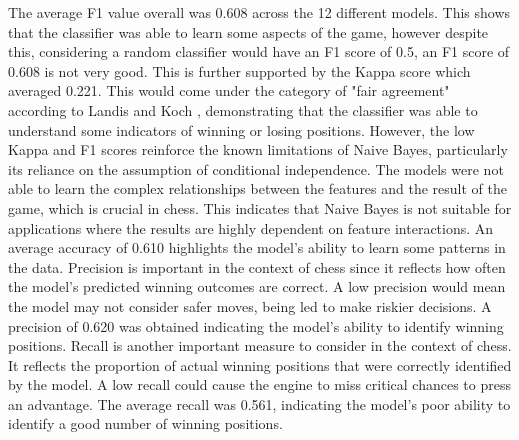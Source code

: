 The average F1 value overall was 0.608 across the 12 different models. This shows that the classifier was able to learn some aspects of the game, however despite this, considering a random classifier would have an F1 score of 0.5, an F1 score of 0.608 is not very good. This is further supported by the Kappa score which averaged 0.221. This would come under the category of "fair agreement" according to Landis and Koch \cite{landisMeasurementObserverAgreement1977}, demonstrating that the classifier was able to understand some indicators of winning or losing positions. However, the low Kappa and F1 scores reinforce the known limitations of Naive Bayes, particularly its reliance on the assumption of conditional independence. The models were not able to learn the complex relationships between the features and the result of the game, which is crucial in chess. This indicates that Naive Bayes is not suitable for applications where the results are highly dependent on feature interactions. An average accuracy of 0.610 highlights the model's ability to learn some patterns in the data. Precision is important in the context of chess since it reflects how often the model's predicted winning outcomes are correct. A low precision would mean the model may not consider safer moves, being led to make riskier decisions. A precision of 0.620 was obtained indicating the model's ability to identify winning positions. Recall is another important measure to consider in the context of chess. It reflects the proportion of actual winning positions that were correctly identified by the model. A low recall could cause the engine to miss critical chances to press an advantage. The average recall was 0.561, indicating the model's poor ability to identify a good number of winning positions. 

